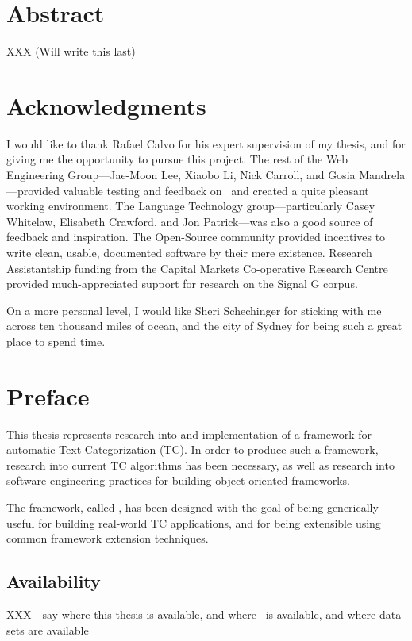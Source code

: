 \chapter*{Abstract}
XXX (Will write this last)

\chapter*{Acknowledgments}

I would like to thank Rafael Calvo for his expert supervision of my
thesis, and for giving me the opportunity to pursue this project.  The
rest of the Web Engineering Group---Jae-Moon Lee, Xiaobo Li, Nick
Carroll, and Gosia Mandrela---provided valuable testing and feedback
on \aicat\ and created a quite pleasant working environment.  The
Language Technology group---particularly Casey Whitelaw, Elisabeth
Crawford, and Jon Patrick---was also a good source of feedback and
inspiration.  The Open-Source community provided incentives to write
clean, usable, documented software by their mere existence.  Research
Assistantship funding from the Capital Markets Co-operative Research
Centre provided much-appreciated support for research on the Signal G
corpus.

On a more personal level, I would like Sheri Schechinger for sticking
with me across ten thousand miles of ocean, and the city of Sydney for
being such a great place to spend time.

\chapter*{Preface}

This thesis represents research into and implementation of a framework
for automatic Text Categorization (TC).  In order to produce such a
framework, research into current TC algorithms has been necessary, as
well as research into software engineering practices for building
object-oriented frameworks.

The framework, called \aicat, has been designed with the goal of being
generically useful for building real-world TC applications, and for
being extensible using common framework extension techniques.

\section*{Availability}

XXX - say where this thesis is available, and where \aicat\ is
available, and where data sets are available

